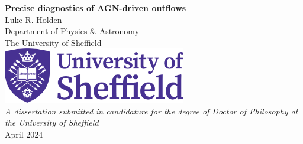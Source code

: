 \begin{titlepage}
    \begin{center}
    \vspace*{1cm}
    \Huge\textbf{Precise diagnostics of AGN-driven outflows} \\
    \vspace{2cm}
    \LARGE{Luke R. Holden} \\
    \vspace{2cm}
    \Large{Department of Physics \& Astronomy} \\
    The University of Sheffield\\
    \vspace{2cm}
    \includegraphics[width=0.6\textwidth]{figures/title_page/UniversityofSheffieldLogo.png}\\
    \vspace{2cm}
    \Large\textit{A dissertation submitted in candidature for the degree of
    Doctor of Philosophy at the University of Sheffield} \\
    \vspace{2cm}
    \Large{April 2024}
    
    \end{center}



\end{titlepage}